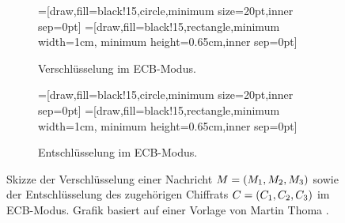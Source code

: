 \begin{figure}[h]
	\centering
	\begin{subfigure}[h]{.45\textwidth}
		\centering
		=[draw,fill=black!15,circle,minimum size=20pt,inner sep=0pt]
		=[draw,fill=black!15,rectangle,minimum width=1cm, minimum height=0.65cm,inner sep=0pt]
		\caption{Verschlüsselung im ECB-Modus.}
	\end{subfigure}
	\hfill
	\begin{subfigure}[h]{.45\textwidth}
		\centering
		=[draw,fill=black!15,circle,minimum size=20pt,inner sep=0pt]
		=[draw,fill=black!15,rectangle,minimum width=1cm, minimum height=0.65cm,inner sep=0pt]
		\caption{Entschlüsselung im ECB-Modus.}
	\end{subfigure}
	\caption{Skizze der Verschlüsselung einer Nachricht $M = (M_{1},M_{2},M_{3})$ sowie der Entschlüsselung des zugehörigen Chiffrats $C = (C_{1},C_{2},C_{3})$ im ECB-Modus. Grafik basiert auf einer Vorlage von Martin Thoma \cite{Thoma2013}.}
\end{figure}

